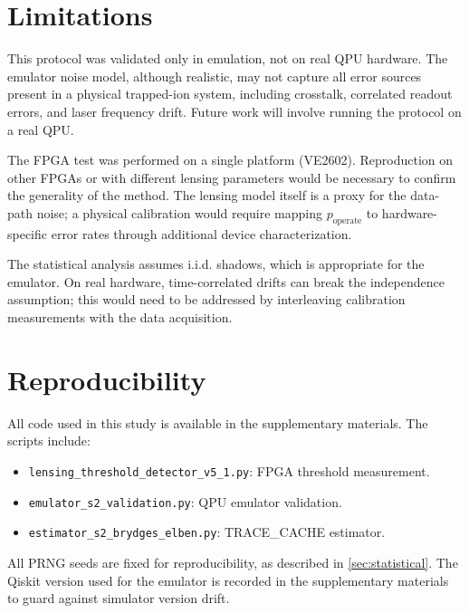 \documentclass[12pt,a4paper,oneside]{book}
\theoremstyle{plain}
\theoremstyle{definition}
\theoremstyle{remark}
\begin{document}
\section{Limitations}
\label{sec:disc_limitations}

This protocol was validated only in emulation, not on real QPU hardware. The emulator noise model, although realistic, may not capture all error sources present in a physical trapped-ion system, including crosstalk, correlated readout errors, and laser frequency drift. Future work will involve running the protocol on a real QPU.

The FPGA test was performed on a single platform (VE2602). Reproduction on other FPGAs or with different lensing parameters would be necessary to confirm the generality of the method. The lensing model itself is a proxy for the data-path noise; a physical calibration would require mapping $p_{\text{operate}}$ to hardware-specific error rates through additional device characterization.

The statistical analysis assumes i.i.d. shadows, which is appropriate for the emulator. On real hardware, time-correlated drifts can break the independence assumption; this would need to be addressed by interleaving calibration measurements with the data acquisition.

\section{Reproducibility}
\label{sec:disc_reproducibility}

All code used in this study is available in the supplementary materials. The scripts include:
\begin{itemize}[itemsep=2pt]
    \item \texttt{lensing\_threshold\_detector\_v5\_1.py}: FPGA threshold measurement.
    \item \texttt{emulator\_s2\_validation.py}: QPU emulator validation.
    \item \texttt{estimator\_s2\_brydges\_elben.py}: TRACE\_CACHE estimator.
\end{itemize}

All PRNG seeds are fixed for reproducibility, as described in \cref{sec:statistical}. The Qiskit version used for the emulator is recorded in the supplementary materials to guard against simulator version drift.
\end{document}
